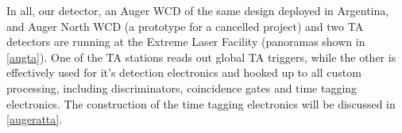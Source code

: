 In all, our detector, an Auger WCD of the same design deployed in Argentina, and Auger North WCD (a prototype for a cancelled project) and two TA detectors are running at the Extreme Laser Facility (panoramas shown in \autoref{augta}). One of the TA stations reads out global TA triggers, while the other is effectively used for it's detection electronics and hooked up to all custom processing, including discriminators, coincidence gates and time tagging electronics. The construction of the time tagging electronics will be discussed in \autoref{augeratta}.
%
%
